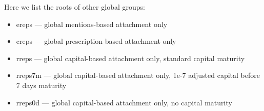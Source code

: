 \documentclass[10pt,oneside]{memoir}
\begin{document}
Here we list the roots of other global groups:


\begin{itemize}


\item ereps --- global mentions-based attachment only

\item creps --- global prescription-based attachment only

\item rreps --- global capital-based attachment only, standard capital maturity

\item rreps7m --- global capital-based attachment only,  1e-7 adjusted capital before 7 days maturity

\item rreps0d --- global capital-based attachment only, no capital maturity
\end{itemize}
\end{document}
